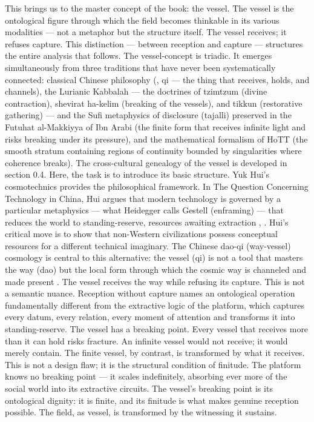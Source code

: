 This brings us to the master concept of the book: the vessel. The vessel is the ontological figure through which the field becomes thinkable in its various modalities — not a metaphor but the structure itself. The vessel receives; it refuses capture. This distinction — between reception and capture — structures the entire analysis that follows. The vessel-concept is triadic. It emerges simultaneously from three traditions that have never been systematically connected: classical Chinese philosophy (, qi — the thing that receives, holds, and channels), the Lurianic Kabbalah — the doctrines of tzimtzum (divine contraction), shevirat ha-kelim (breaking of the vessels), and tikkun (restorative gathering) — and the Sufi metaphysics of disclosure (tajalli) preserved in the Futuhat al-Makkiyya of Ibn Arabi (the finite form that receives infinite light and risks breaking under its pressure), and the mathematical formalism of HoTT (the smooth stratum containing regions of continuity bounded by singularities where coherence breaks). The cross-cultural genealogy of the vessel is developed in section 0.4. Here, the task is to introduce its basic structure. Yuk Hui’s cosmotechnics provides the philosophical framework. In The Question Concerning Technology in China, Hui argues that modern technology is governed by a particular metaphysics — what Heidegger calls Gestell (enframing) — that reduces the world to standing-reserve, resources awaiting extraction \cite{hui_2017}, \cite{heidegger_1953}. Hui’s critical move is to show that non-Western civilizations possess conceptual resources for a different technical imaginary. The Chinese dao-qi (way-vessel) cosmology is central to this alternative: the vessel (qi) is not a tool that masters the way (dao) but the local form through which the cosmic way is channeled and made present \cite[pp.~85--112]{hui_2017}. The vessel receives the way while refusing its capture. This is not a semantic nuance. Reception without capture names an ontological operation fundamentally different from the extractive logic of the platform, which captures every datum, every relation, every moment of attention and transforms it into standing-reserve. The vessel has a breaking point. Every vessel that receives more than it can hold risks fracture. An infinite vessel would not receive; it would merely contain. The finite vessel, by contrast, is transformed by what it receives. This is not a design flaw; it is the structural condition of finitude. The platform knows no breaking point — it scales indefinitely, absorbing ever more of the social world into its extractive circuits. The vessel’s breaking point is its ontological dignity: it is finite, and its finitude is what makes genuine reception possible. The field, as vessel, is transformed by the witnessing it sustains.

